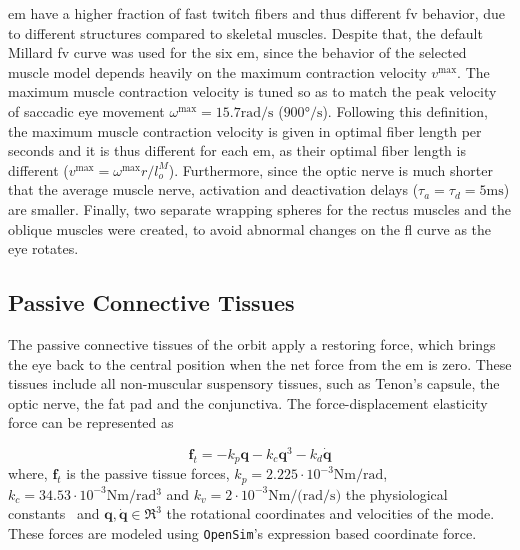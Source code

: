 \documentclass[11pt,a4paper,draft=false]{report}
\renewcommand*{\vec}[1]{\bm{#1}}
\newcommand{\R}[1]{\mathfrak{R}^{#1}}
\newcommand{\inr}[1]{\in\R{#1}}
\begin{document}
\gls{em} have a higher fraction of fast twitch fibers and thus different
\gls{fv} behavior, due to different structures compared to skeletal
muscles. Despite that, the default Millard \gls{fv} curve was used for the six
\gls{em}, since the behavior of the selected muscle model depends heavily on the
maximum contraction velocity $v^{\text{max}}$. The maximum muscle contraction
velocity is tuned so as to match the peak velocity of saccadic eye movement
$\omega^{\text{max}} = 15.7 \si{\radian / \s}$ ($900 \si{\degree /
  \s}$). Following this definition, the maximum muscle contraction velocity is
given in optimal fiber length per seconds and it is thus different for each
\gls{em}, as their optimal fiber length is different
($v^{\text{max}} = \omega^{\text{max}} r / l_o^M$). Furthermore, since the optic
nerve is much shorter that the average muscle nerve, activation and deactivation
delays ($\tau_a = \tau_d = 5 \si{\milli\s}$) are smaller. Finally, two
separate wrapping spheres for the rectus muscles and the oblique muscles were
created, to avoid abnormal changes on the \gls{fl} curve as the eye rotates.

\subsection*{Passive Connective Tissues}\label{sec:passive-connective-tissues}

The passive connective tissues of the orbit apply a restoring force, which
brings the eye back to the central position when the net force from the \gls{em}
is zero. These tissues include all non-muscular suspensory tissues, such as
Tenon's capsule, the optic nerve, the fat pad and the conjunctiva. The
force-displacement elasticity force can be represented as

\begin{equation}\label{equ:passive-tissue}
  \vec{f}_t = -k_p \vec{q} - k_c \vec{q}^3 - k_d \vec{\dot{q}}
\end{equation}
% 
where, $\vec{f}_t$ is the passive tissue forces,
$k_p= 2.225 \cdot 10^{-3} \si{\N \m / \radian}$,
$k_c= 34.53 \cdot 10^{-3} \si{\N \m / \radian^3}$ and
$k_v= 2 \cdot 10^{-3} \si{\N \m / (\radian / \s)}$ the physiological
constants~\cite{Robinson1969a, Collins1981, Priamikov2016} and
$\vec{q}, \vec{\dot{q}} \inr{3}$ the rotational coordinates and velocities of
the mode. These forces are modeled using \texttt{OpenSim}'s expression based
coordinate force.
\end{document}
